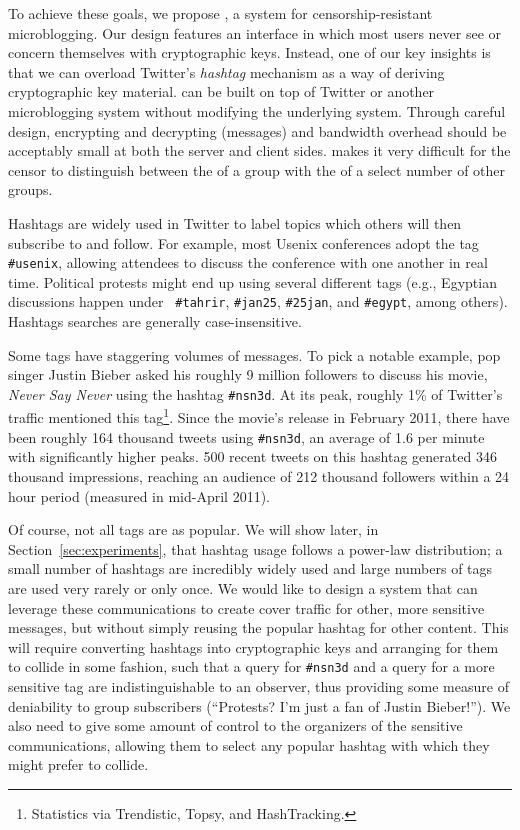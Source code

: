 To achieve these goals, we propose \hoot, a system for
censorship-resistant microblogging. Our design features an interface in
which most users never see or concern themselves with cryptographic
keys. Instead, one of our key insights is that we can overload Twitter's
{\em hashtag} mechanism as a way of deriving cryptographic key
material. \hoot can be built on top of Twitter or another microblogging
system without modifying the underlying system. Through careful design,
encrypting and decrypting {\em \msgs} (\hoot messages) and bandwidth
overhead should be acceptably small at both the server and client sides.
\hoot makes it very difficult for the censor to distinguish between the
\msgs of a group with the \msgs of a select number of other groups.


Hashtags are widely used in Twitter to label topics which others will
then subscribe to and follow. For example, most Usenix conferences adopt
the tag {\tt \#usenix}, allowing attendees to discuss the conference
with one another in real time. Political protests might end up using
several different tags (e.g., Egyptian discussions happen under {\tt
  \#tahrir}, {\tt \#jan25}, {\tt \#25jan}, and {\tt \#egypt}, among
others). Hashtags searches are generally case-insensitive.

Some tags have staggering volumes of messages. To pick a notable example, pop singer Justin Bieber asked his roughly 9 million followers to discuss his movie, {\em Never Say Never} using the hashtag {\tt \#nsn3d}. At its peak, roughly 1\% of Twitter's traffic mentioned this tag\footnote{Statistics via Trendistic, Topsy, and HashTracking.}. Since the movie's release in February 2011, there have been roughly 164 thousand tweets using {\tt \#nsn3d}, an average of 1.6 per minute with significantly higher peaks. 500 recent tweets on this hashtag generated 346 thousand impressions, reaching an audience of 212 thousand followers within a 24 hour period (measured in mid-April 2011). 

Of course, not all tags are as popular. We will show later, in Section~\ref{sec:experiments}, that hashtag usage follows a power-law distribution; a small number of hashtags are incredibly widely used and large numbers of tags are used very rarely or only once. We would like to design a system that can leverage these communications to create cover traffic for other, more sensitive messages, but without simply reusing the popular hashtag for other content. This will require converting hashtags into cryptographic keys and arranging for them to collide in some fashion, such that a query for {\tt \#nsn3d} and a query for a more sensitive tag are indistinguishable to an observer, thus providing some measure of deniability to group subscribers (``Protests? I'm just a fan of Justin Bieber!''). We also need to give some amount of control to the organizers of the sensitive communications, allowing them to select any popular hashtag with which they might prefer to collide.

